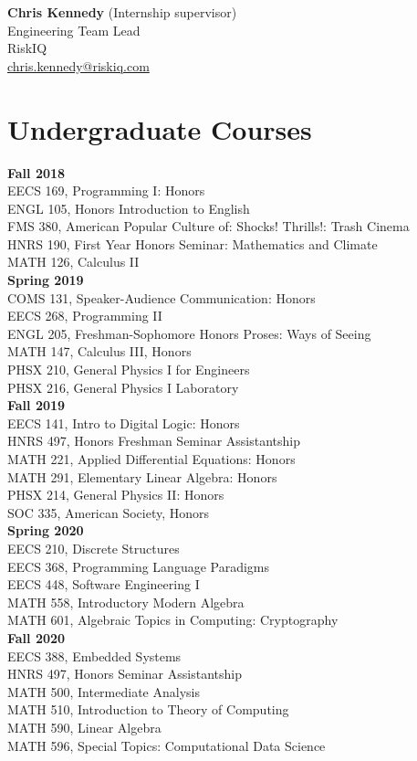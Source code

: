 \documentclass[a4paper, 10pt]{article}
\begin{document}
\textbf{Chris Kennedy} (Internship supervisor)\\
Engineering Team Lead\\
RiskIQ\\
\href{mailto:chris.kennedy@riskiq.com}{chris.kennedy@riskiq.com}

\section{Undergraduate Courses}
\textbf{Fall 2018}\\
EECS 169, Programming I: Honors\\
ENGL 105, Honors Introduction to English\\
FMS 380, American Popular Culture of: Shocks! Thrills!: Trash Cinema\\
HNRS 190, First Year Honors Seminar: Mathematics and Climate\\
MATH 126, Calculus II\\
\textbf{Spring 2019}\\
COMS 131, Speaker-Audience Communication: Honors\\
EECS 268, Programming II\\
ENGL 205, Freshman-Sophomore Honors Proses: Ways of Seeing\\
MATH 147, Calculus III, Honors\\
PHSX 210, General Physics I for Engineers\\
PHSX 216, General Physics I Laboratory\\
\textbf{Fall 2019}\\
EECS 141, Intro to Digital Logic: Honors\\
HNRS 497, Honors Freshman Seminar Assistantship\\
MATH 221, Applied Differential Equations: Honors\\
MATH 291, Elementary Linear Algebra: Honors\\
PHSX 214, General Physics II: Honors\\
SOC 335, American Society, Honors\\
\textbf{Spring 2020}\\
EECS 210, Discrete Structures\\
EECS 368, Programming Language Paradigms\\
EECS 448, Software Engineering I\\
MATH 558, Introductory Modern Algebra\\
MATH 601, Algebraic Topics in Computing: Cryptography\\
\textbf{Fall 2020}\\
EECS 388, Embedded Systems\\
HNRS 497, Honors Seminar Assistantship\\
MATH 500, Intermediate Analysis\\
MATH 510, Introduction to Theory of Computing\\
MATH 590, Linear Algebra\\
MATH 596, Special Topics: Computational Data Science\\
\end{document}
